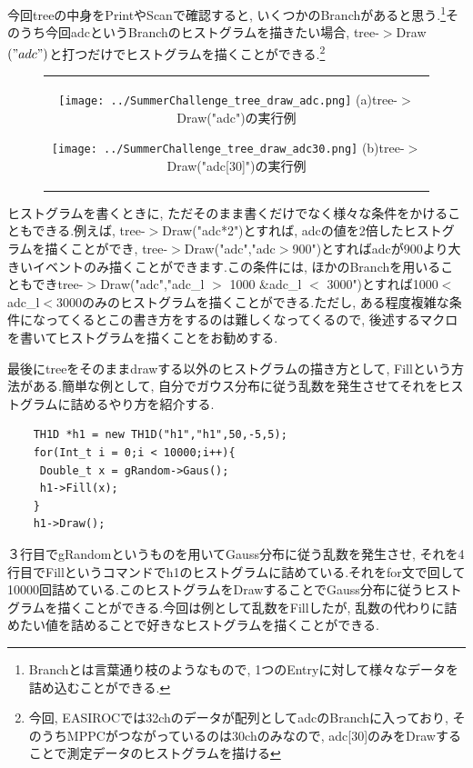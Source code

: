 今回treeの中身をPrintやScanで確認すると, いくつかのBranchがあると思う.\footnote{Branchとは言葉通り枝のようなもので, 1つのEntryに対して様々なデータを詰め込むことができる.}そのうち今回adcというBranchのヒストグラムを描きたい場合, tree-$>$Draw$\left("adc"\right)$と打つだけでヒストグラムを描くことができる.\footnote{今回, EASIROCでは32chのデータが配列としてadcのBranchに入っており, そのうちMPPCがつながっているのは30chのみなので, adc[30]のみをDrawすることで測定データのヒストグラムを描ける}
\begin{figure}[htbp]
  \begin{center}
    \begin{tabular}{c}

      \begin{minipage}{0.5\hsize}
        \begin{center}
          \texttt{[image: ../SummerChallenge\_tree\_draw\_adc.png]}
          \hspace{1.6cm} (a)tree-$>$Draw("adc")の実行例
        \end{center}
      \end{minipage}

      \begin{minipage}{0.5\hsize}
        \begin{center}
          \texttt{[image: ../SummerChallenge\_tree\_draw\_adc30.png]}
          \hspace{1.6cm} (b)tree-$>$Draw("adc[30]")の実行例
        \end{center}
      \end{minipage}
    \end{tabular}
    \label{fig:tree_draw}
  \end{center}
\end{figure}

ヒストグラムを書くときに, ただそのまま書くだけでなく様々な条件をかけることもできる.例えば, tree-$>$Draw("adc*2")とすれば, adcの値を2倍したヒストグラムを描くことができ, tree-$>$Draw("adc","adc$>$900")とすればadcが900より大きいイベントのみ描くことができます.この条件には, ほかのBranchを用いることもできtree-$>$Draw("adc","adc\_l $>$ 1000 \&adc\_l $<$ 3000")とすれば1000$<$adc\_l$<$3000のみのヒストグラムを描くことができる.ただし, ある程度複雑な条件になってくるとこの書き方をするのは難しくなってくるので, 後述するマクロを書いてヒストグラムを描くことをお勧めする.

最後にtreeをそのままdrawする以外のヒストグラムの描き方として, Fillという方法がある.簡単な例として, 自分でガウス分布に従う乱数を発生させてそれをヒストグラムに詰めるやり方を紹介する.
\begin{lstlisting}
    TH1D *h1 = new TH1D("h1","h1",50,-5,5);
    for(Int_t i = 0;i < 10000;i++){
     Double_t x = gRandom->Gaus();
     h1->Fill(x);
    }
    h1->Draw();
 \end{lstlisting}
３行目でgRandomというものを用いてGauss分布に従う乱数を発生させ, それを4行目でFillというコマンドでh1のヒストグラムに詰めている.それをfor文で回して10000回詰めている.このヒストグラムをDrawすることでGauss分布に従うヒストグラムを描くことができる.今回は例として乱数をFillしたが, 乱数の代わりに詰めたい値を詰めることで好きなヒストグラムを描くことができる.

